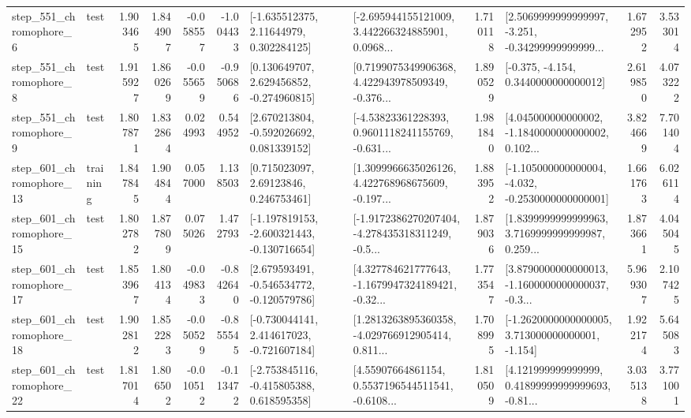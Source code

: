 \begin{tabular}{llrrrrllrlrr}
   step\_551\_chromophore\_6 &      test &      1.903465 &    1.844907 &     -0.058557 & -1.004433 &     [-1.635512375, 2.11644979, 0.302284125] &  [-2.695944155121009, 3.442266324885901, 0.0968... &       1.710118 &  [2.5069999999999997, -3.251, -0.34299999999999... &            1.672952 &          3.533014 \\
   step\_551\_chromophore\_8 &      test &      1.915927 &    1.860269 &     -0.055659 & -0.950686 &    [0.130649707, 2.629456852, -0.274960815] &  [0.7199075349906368, 4.422943978509349, -0.376... &       1.890529 &               [-0.375, -4.154, 0.3440000000000012] &            2.619850 &          4.073222 \\
   step\_551\_chromophore\_9 &      test &      1.807871 &    1.832864 &      0.024993 &  0.544952 &    [2.670213804, -0.592026692, 0.081339152] &  [-4.53823361228393, 0.9601118241155769, -0.631... &       1.981840 &  [4.045000000000002, -1.1840000000000002, 0.102... &            3.824669 &          7.701404 \\
  step\_601\_chromophore\_13 &  training &      1.847845 &    1.904844 &      0.057000 &  1.138503 &      [0.715023097, 2.69123846, 0.246753461] &  [1.3099966635026126, 4.422768968675609, -0.197... &       1.883952 &  [-1.105000000000004, -4.032, -0.2530000000000001] &            1.661763 &          6.026114 \\
  step\_601\_chromophore\_15 &      test &      1.802782 &    1.877809 &      0.075026 &  1.472793 &  [-1.197819153, -2.600321443, -0.130716654] &  [-1.9172386270207404, -4.278435318311249, -0.5... &       1.879036 &  [1.8399999999999963, 3.7169999999999987, 0.259... &            1.873661 &          4.045045 \\
  step\_601\_chromophore\_17 &      test &      1.853967 &    1.804134 &     -0.049833 & -0.842640 &   [2.679593491, -0.546534772, -0.120579786] &  [4.327784621777643, -1.1679947324189421, -0.32... &       1.773547 &  [3.8790000000000013, -1.1600000000000037, -0.3... &            5.969307 &          2.107425 \\
  step\_601\_chromophore\_18 &      test &      1.902812 &    1.852283 &     -0.050529 & -0.855545 &   [-0.730044141, 2.414617023, -0.721607184] &  [1.2813263895360358, -4.029766912905414, 0.811... &       1.708995 &   [-1.2620000000000005, 3.713000000000001, -1.154] &            1.922174 &          5.645083 \\
  step\_601\_chromophore\_22 &      test &      1.817014 &    1.806502 &     -0.010512 & -0.113472 &   [-2.753845116, -0.415805388, 0.618595358] &  [4.55907664861154, 0.5537196544511541, -0.6108... &       1.810509 &  [4.121999999999999, 0.41899999999999693, -0.81... &            3.035138 &          3.771001 \\

\end{tabular}
